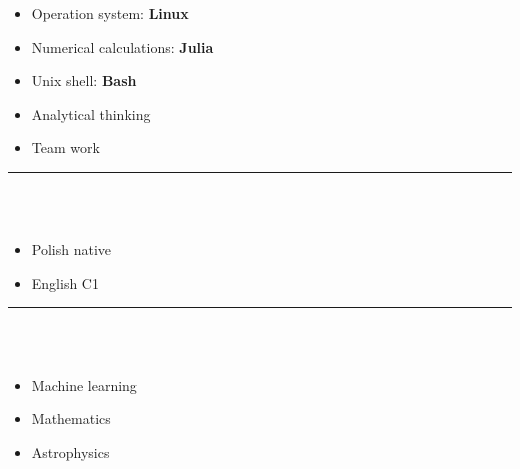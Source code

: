\documentclass[10pt]{article}
\begin{document}
\begin{minipage}[t]{0.30\textwidth}
\begin{itemize}[leftmargin=*]
            \item Operation system: \textbf{Linux}
            \item Numerical calculations: \textbf{Julia}
            \item Unix shell: \textbf{Bash} 
            \item Analytical thinking
            \item Team work
        \end{itemize}
        \rule{6cm}{1pt} \\ \\
        \fontsize{10pt}{10pt}
        \begin{itemize}[leftmargin=*]
            \setlength{\parskip}{0pt}
            \item Polish native
            \item English C1
        \end{itemize}
        \rule{6cm}{1pt} \\ \\
        \fontsize{10pt}{10pt}
        \begin{itemize}[leftmargin=*]
            \setlength{\parskip}{0pt}
            \item Machine learning
            \item Mathematics 
            \item Astrophysics
        \end{itemize}
    \end{minipage}
    \hfill %
\end{document}
